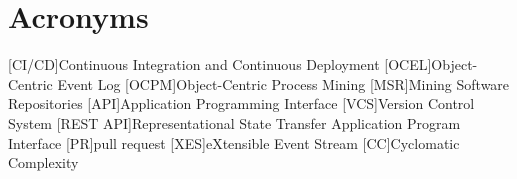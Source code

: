 \chapter*{Acronyms}
\begin{acronym}
[CI/CD]{Continuous Integration and Continuous Deployment}
[OCEL]{Object-Centric Event Log}
[OCPM]{Object-Centric Process Mining}
[MSR]{Mining Software Repositories}
[API]{Application Programming Interface}
[VCS]{Version Control System}
[REST API]{Representational State Transfer Application Program Interface}
[PR]{pull request}
[XES]{eXtensible Event Stream}
[CC]{Cyclomatic Complexity}
\end{acronym}